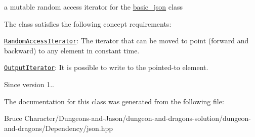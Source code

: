 a mutable random access iterator for the \hyperlink{classnlohmann_1_1basic__json}{basic\+\_\+json} class 

The class satisfies the following concept requirements\+:
\begin{DoxyItemize}
\item \href{http://en.cppreference.com/w/cpp/concept/RandomAccessIterator}{\tt Random\+Access\+Iterator}\+: The iterator that can be moved to point (forward and backward) to any element in constant time.
\item \href{http://en.cppreference.com/w/cpp/concept/OutputIterator}{\tt Output\+Iterator}\+: It is possible to write to the pointed-\/to element.
\end{DoxyItemize}

\begin{DoxySince}{Since}
version 1.. 
\end{DoxySince}


The documentation for this class was generated from the following file\+:\begin{DoxyCompactItemize}
\item 
Bruce Character/\+Dungeons-\/and-\/\+Jason/dungeon-\/and-\/dragons-\/solution/dungeon-\/and-\/dragons/\+Dependency/json.\+hpp\end{DoxyCompactItemize}
